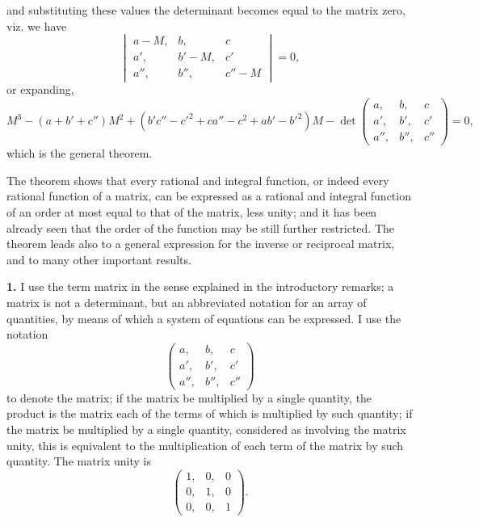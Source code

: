 \documentclass[12pt,a4paper]{article}
\theoremstyle{definition}
\begin{document}
and substituting these values the determinant becomes equal to the matrix zero, viz. we have
\[
\begin{vmatrix}
a-M, & b, & c \\
a', & b'-M, & c' \\
a'', & b'', & c''-M
\end{vmatrix} = 0,
\]
or expanding,
\[
M^3 - (a+b'+c'')M^2 + (b'c''-c'^2+ca''-c^2+ab'-b'^2)M - \det\begin{pmatrix} a,&b,&c\\a',&b',&c'\\a'',&b'',&c''\end{pmatrix} = 0,
\]
which is the general theorem.

The theorem shows that every rational and integral function, or indeed every rational function of a matrix, can be expressed as a rational and integral function of an order at most equal to that of the matrix, less unity; and it has been already seen that the order of the function may be still further restricted. The theorem leads also to a general expression for the inverse or reciprocal matrix, and to many other important results.

\medskip
\noindent\textbf{1.} I use the term matrix in the sense explained in the introductory remarks; a matrix is not a determinant, but an abbreviated notation for an array of quantities, by means of which a system of equations can be expressed. I use the notation
\[
\begin{pmatrix} a, & b, & c \\ a', & b', & c' \\ a'', & b'', & c'' \end{pmatrix}
\]
to denote the matrix; if the matrix be multiplied by a single quantity, the product is the matrix each of the terms of which is multiplied by such quantity; if the matrix be multiplied by a single quantity, considered as involving the matrix unity, this is equivalent to the multiplication of each term of the matrix by such quantity. The matrix unity is
\[
\begin{pmatrix} 1, & 0, & 0 \\ 0, & 1, & 0 \\ 0, & 0, & 1 \end{pmatrix}.
\]
\end{document}
